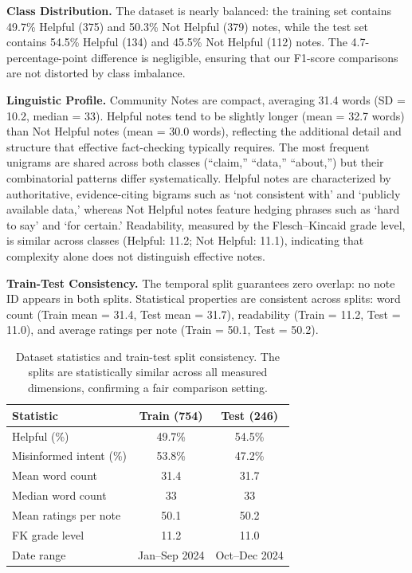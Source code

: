 \documentclass[11pt]{article}
\begin{document}
	\noindent\textbf{Class Distribution.} The dataset is nearly balanced: the training set contains 49.7\% Helpful (375) and 50.3\% Not Helpful (379) notes, while the test set contains 54.5\% Helpful (134) and 45.5\% Not Helpful (112) notes. The 4.7-percentage-point difference is negligible, ensuring that our F1-score comparisons are not distorted by class imbalance.

	\noindent\textbf{Linguistic Profile.} Community Notes are compact, averaging 31.4 words (SD = 10.2, median = 33). Helpful notes tend to be slightly longer (mean = 32.7 words) than Not Helpful notes (mean = 30.0 words), reflecting the additional detail and structure that effective fact-checking typically requires. The most frequent unigrams are shared across both classes (``claim,'' ``data,'' ``about,'') but their combinatorial patterns differ systematically. Helpful notes are characterized by authoritative, evidence-citing bigrams such as `not consistent with' and `publicly available data,' whereas Not Helpful notes feature hedging phrases such as `hard to say' and `for certain.' Readability, measured by the Flesch--Kincaid grade level, is similar across classes (Helpful: 11.2; Not Helpful: 11.1), indicating that complexity alone does not distinguish effective notes.

	\noindent\textbf{Train-Test Consistency.} The temporal split guarantees zero overlap: no note ID appears in both splits. Statistical properties are consistent across splits: word count (Train mean = 31.4, Test mean = 31.7), readability (Train = 11.2, Test = 11.0), and average ratings per note (Train = 50.1, Test = 50.2).

	\begin{table}[t]
		\centering
		\small
		\setlength{\tabcolsep}{4pt}
		\begin{tabular}{lcc}
			\toprule
			\textbf{Statistic} & \textbf{Train (754)} & \textbf{Test (246)} \\
			\midrule
			Helpful (\%) & 49.7\% & 54.5\% \\
			Misinformed intent (\%) & 53.8\% & 47.2\% \\
			Mean word count & 31.4 & 31.7 \\
			Median word count & 33 & 33 \\
			Mean ratings per note & 50.1 & 50.2 \\
			FK grade level & 11.2 & 11.0 \\
			Date range & Jan--Sep 2024 & Oct--Dec 2024 \\
			\bottomrule
		\end{tabular}
		\caption{Dataset statistics and train-test split consistency. The splits are statistically similar across all measured dimensions, confirming a fair comparison setting.}
		\label{tab:dataset-stats}
	\end{table}
	
\end{document}
